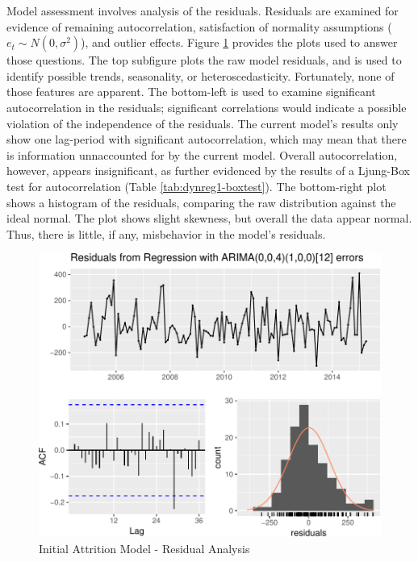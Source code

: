 \documentclass[12pt,letterpaper,toc=flat,oneside]{report}
\theoremstyle{definition}
\theoremstyle{definition}
\theoremstyle{definition}
\theoremstyle{remark}
\begin{document}
Model assessment involves analysis of the residuals. Residuals are
examined for evidence of remaining autocorrelation, satisfaction of
normality assumptions (\(e_t \sim N(0,\sigma^2)\)), and outlier effects.
Figure \ref{fig:dynreg1-resid} provides the plots used to answer those
questions. The top subfigure plots the raw model residuals, and is used
to identify possible trends, seasonality, or heteroscedasticity.
Fortunately, none of those features are apparent. The bottom-left is
used to examine significant autocorrelation in the residuals;
significant correlations would indicate a possible violation of the
independence of the residuals. The current model's results only show one
lag-period with significant autocorrelation, which may mean that there
is information unnaccounted for by the current model. Overall
autocorrelation, however, appears insignificant, as further evidenced by
the results of a Ljung-Box test for autocorrelation (Table
\ref{tab:dynreg1-boxtest}). The bottom-right plot shows a histogram of
the residuals, comparing the raw distribution against the ideal normal.
The plot shows slight skewness, but overall the data appear normal.
Thus, there is little, if any, misbehavior in the model's residuals.

\begin{figure}[H]

{\centering \includegraphics{elliott-econometric-personnel-retention-18_files/figure-latex/dynreg1-resid-1} 

}

\caption{Initial Attrition Model - Residual Analysis}\label{fig:dynreg1-resid}
\end{figure}
\end{document}
